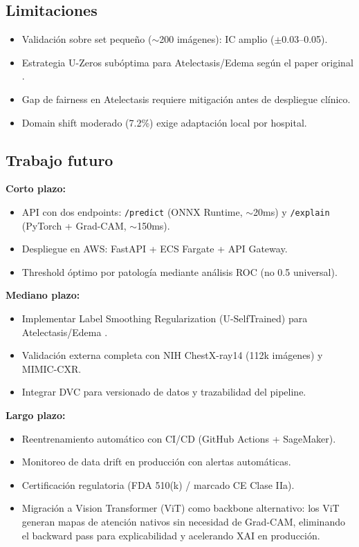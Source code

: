 \subsection{Limitaciones}

\begin{itemize}
    \item Validaci\'on sobre set peque\~no ($\sim$200 im\'agenes): IC amplio ($\pm$0.03--0.05).
    \item Estrategia U-Zeros sub\'optima para Atelectasis/Edema seg\'un el paper original \cite{irvin2019chexpert}.
    \item Gap de fairness en Atelectasis requiere mitigaci\'on antes de despliegue cl\'inico.
    \item Domain shift moderado (7.2\%) exige adaptaci\'on local por hospital.
\end{itemize}

\subsection{Trabajo futuro}

\textbf{Corto plazo:}
\begin{itemize}
    \item API con dos endpoints: \texttt{/predict} (ONNX Runtime, $\sim$20ms) y \texttt{/explain} (PyTorch + Grad-CAM, $\sim$150ms).
    \item Despliegue en AWS: FastAPI + ECS Fargate + API Gateway.
    \item Threshold \'optimo por patolog\'ia mediante an\'alisis ROC (no 0.5 universal).
\end{itemize}

\textbf{Mediano plazo:}
\begin{itemize}
    \item Implementar Label Smoothing Regularization (U-SelfTrained) para Atelectasis/Edema \cite{pham2021interpreting}.
    \item Validaci\'on externa completa con NIH ChestX-ray14 (112k im\'agenes) y MIMIC-CXR.
    \item Integrar DVC para versionado de datos y trazabilidad del pipeline.
\end{itemize}

\textbf{Largo plazo:}
\begin{itemize}
    \item Reentrenamiento autom\'atico con CI/CD (GitHub Actions + SageMaker).
    \item Monitoreo de data drift en producci\'on con alertas autom\'aticas.
    \item Certificaci\'on regulatoria (FDA 510(k) / marcado CE Clase IIa).
    \item Migraci\'on a Vision Transformer (ViT) como backbone alternativo: los ViT generan mapas de atenci\'on nativos sin necesidad de Grad-CAM, eliminando el backward pass para explicabilidad y acelerando XAI en producci\'on.
\end{itemize}
